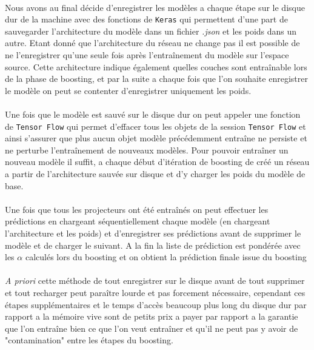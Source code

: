 \documentclass[11 pt]{article}
\begin{document}
\paragraph{}Nous avons au final décide d'enregistrer les modèles a chaque étape sur le disque dur de la machine avec des fonctions de \texttt{Keras} qui permettent d'une part de sauvegarder l'architecture du modèle dans un fichier \emph{.json} et les poids dans un autre. Etant donné que l'architecture du réseau ne change pas il est possible de ne l'enregistrer qu'une seule fois après l’entraînement du modèle sur l'espace source. Cette architecture indique également quelles couches sont entraînable lors de la phase de boosting, et par la suite a chaque fois que l'on souhaite enregistrer le modèle on peut se contenter d'enregistrer uniquement les poids.

\paragraph{}Une fois que le modèle est sauv\'e sur le disque dur on peut appeler une fonction de \texttt{Tensor Flow} qui permet d'effacer tous les objets de la session \texttt{Tensor Flow} et ainsi s'assurer que plus aucun objet modèle précédemment entraîne ne persiste et ne perturbe l’entraînement de nouveaux modèles. Pour pouvoir entraîner un nouveau modèle il suffit, a chaque début d’itération de boosting de créé un réseau a partir de l'architecture sauvée sur disque et d'y charger les poids du modèle de base.

\paragraph{} Une fois que tous les projecteurs ont été entraînés on peut effectuer les prédictions en chargeant séquentiellement chaque modèle (en chargeant l'architecture et les poids) et d'enregistrer ses prédictions avant de supprimer le modèle et de charger le suivant. A la fin la liste de prédiction est pondérée avec les $\alpha$ calcul\'es lors du boosting et on obtient la prédiction finale issue du boosting

\paragraph{} \emph{A priori} cette méthode de tout enregistrer sur le disque avant de tout supprimer et tout recharger peut paraître lourde et pas forcement nécessaire, cependant ces étapes supplémentaires et le temps d’accès beaucoup plus long du disque dur par rapport a la mémoire vive sont de petits prix a payer par rapport a la garantie que l'on entraîne bien ce que l'on veut entraîner et qu'il ne peut pas y avoir de "contamination" entre les étapes du boosting.
\end{document}
